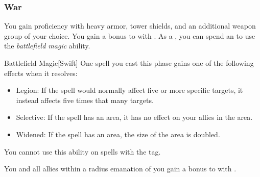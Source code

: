         \subsubsection{War}
             You gain proficiency with heavy armor, tower shields, and an additional weapon group of your choice.
             You gain a  bonus to  with .
             As a , you can spend an  to use the \textit{battlefield magic} ability.
            \begin{ability}{Battlefield Magic}[Swift]
                One spell you cast this phase gains one of the following effects when it resolves:
                \begin{itemize}
                    \item Legion: If the spell would normally affect five or more specific targets, it instead affects five times that many targets.
                    \item Selective: If the spell has an area, it has no effect on your allies in the area.
                    \item Widened: If the spell has an area, the size of the area is doubled.
                \end{itemize}
                You cannot use this ability on spells with the  tag.
            \end{ability}
             You and all allies within a \arealarge radius emanation of you gain a  bonus to  with .

